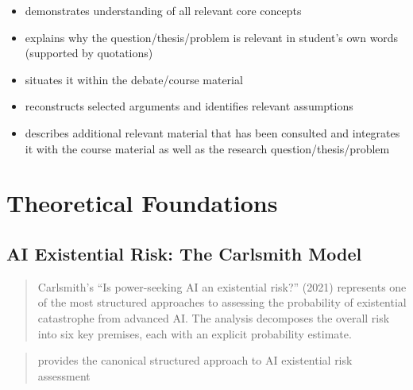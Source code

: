 \documentclass[
  11pt,
  letterpaper,
]{book}
\begin{document}
\begin{tcolorbox}[enhanced jigsaw, colbacktitle=quarto-callout-note-color!10!white, toprule=.15mm, coltitle=black, opacityback=0, colback=white, bottomtitle=1mm, title=\textcolor{quarto-callout-note-color}{\faInfo}\hspace{0.5em}{20\% of Grade: \textasciitilde{} 29\% of text \textasciitilde{} 8700
words \textasciitilde{} 20 pages}, rightrule=.15mm, bottomrule=.15mm, breakable, arc=.35mm, toptitle=1mm, leftrule=.75mm, titlerule=0mm, left=2mm, opacitybacktitle=0.6, colframe=quarto-callout-note-color-frame]

\begin{itemize}
\item
  demonstrates understanding of all relevant core concepts
\item
  explains why the question/thesis/problem is relevant in student's own
  words (supported by quotations)
\item
  situates it within the debate/course material
\item
  reconstructs selected arguments and identifies relevant assumptions
\item
  describes additional relevant material that has been consulted and
  integrates it with the course material as well as the research
  question/thesis/problem
\end{itemize}

\end{tcolorbox}

\section{Theoretical Foundations}\label{sec-theoretical-foundations}

\subsection{AI Existential Risk: The Carlsmith
Model}\label{sec-carlsmith-model}

\begin{quote}
Carlsmith's ``Is power-seeking AI an existential risk?'' (2021)
represents one of the most structured approaches to assessing the
probability of existential catastrophe from advanced AI. The analysis
decomposes the overall risk into six key premises, each with an explicit
probability estimate.
\end{quote}

\begin{quote}
\textcite{carlsmith2021} provides the canonical structured approach to
AI existential risk assessment
\end{quote}
\end{document}
